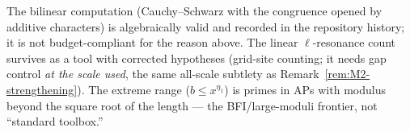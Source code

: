 \begin{remark}
The bilinear computation (Cauchy--Schwarz with the congruence opened
by additive characters) is algebraically valid and recorded in the
repository history; it is not budget-compliant for the reason above.
The linear $\ell$-resonance count survives as a tool with corrected
hypotheses (grid-site counting; it needs gap control \emph{at the
scale used}, the same all-scale subtlety as
Remark~\ref{rem:M2-strengthening}). The extreme range
($b\le x^{\eta_1}$) is primes in APs with modulus beyond the square
root of the length --- the BFI/large-moduli frontier, not
``standard toolbox.''
\end{remark}
